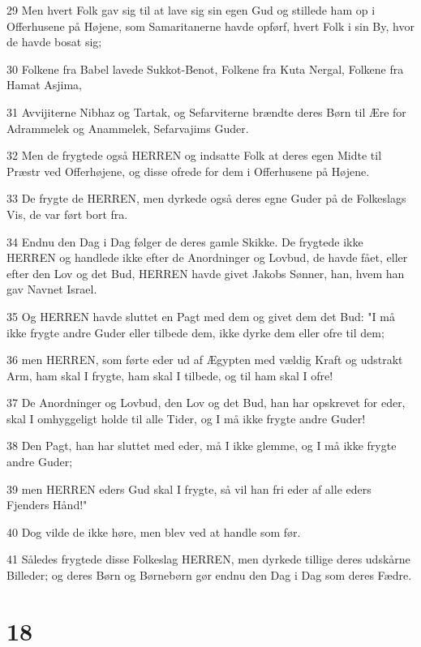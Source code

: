 \par 29 Men hvert Folk gav sig til at lave sig sin egen Gud og stillede ham op i Offerhusene på Højene, som Samaritanerne havde opførf, hvert Folk i sin By, hvor de havde bosat sig;
\par 30 Folkene fra Babel lavede Sukkot-Benot, Folkene fra Kuta Nergal, Folkene fra Hamat Asjima,
\par 31 Avvijiterne Nibhaz og Tartak, og Sefarviterne brændte deres Børn til Ære for Adrammelek og Anammelek, Sefarvajims Guder.
\par 32 Men de frygtede også HERREN og indsatte Folk at deres egen Midte til Præstr ved Offerhøjene, og disse ofrede for dem i Offerhusene på Højene.
\par 33 De frygte de HERREN, men dyrkede også deres egne Guder på de Folkeslags Vis, de var ført bort fra.
\par 34 Endnu den Dag i Dag følger de deres gamle Skikke. De frygtede ikke HERREN og handlede ikke efter de Anordninger og Lovbud, de havde fået, eller efter den Lov og det Bud, HERREN havde givet Jakobs Sønner, han, hvem han gav Navnet Israel.
\par 35 Og HERREN havde sluttet en Pagt med dem og givet dem det Bud: "I må ikke frygte andre Guder eller tilbede dem, ikke dyrke dem eller ofre til dem;
\par 36 men HERREN, som førte eder ud af Ægypten med vældig Kraft og udstrakt Arm, ham skal I frygte, ham skal I tilbede, og til ham skal I ofre!
\par 37 De Anordninger og Lovbud, den Lov og det Bud, han har opskrevet for eder, skal I omhyggeligt holde til alle Tider, og I må ikke frygte andre Guder!
\par 38 Den Pagt, han har sluttet med eder, må I ikke glemme, og I må ikke frygte andre Guder;
\par 39 men HERREN eders Gud skal I frygte, så vil han fri eder af alle eders Fjenders Hånd!"
\par 40 Dog vilde de ikke høre, men blev ved at handle som før.
\par 41 Således frygtede disse Folkeslag HERREN, men dyrkede tillige deres udskårne Billeder; og deres Børn og Børnebørn gør endnu den Dag i Dag som deres Fædre.

\chapter{18}

